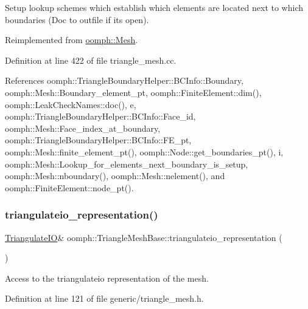 Setup lookup schemes which establish which elements are located next to which boundaries (Doc to outfile if it\textquotesingle{}s open). 

Reimplemented from \hyperlink{classoomph_1_1Mesh_a413cbcbea4fb1111703da9ee97429640}{oomph\+::\+Mesh}.



Definition at line 422 of file triangle\+\_\+mesh.\+cc.



References oomph\+::\+Triangle\+Boundary\+Helper\+::\+B\+C\+Info\+::\+Boundary, oomph\+::\+Mesh\+::\+Boundary\+\_\+element\+\_\+pt, oomph\+::\+Finite\+Element\+::dim(), oomph\+::\+Leak\+Check\+Names\+::doc(), e, oomph\+::\+Triangle\+Boundary\+Helper\+::\+B\+C\+Info\+::\+Face\+\_\+id, oomph\+::\+Mesh\+::\+Face\+\_\+index\+\_\+at\+\_\+boundary, oomph\+::\+Triangle\+Boundary\+Helper\+::\+B\+C\+Info\+::\+F\+E\+\_\+pt, oomph\+::\+Mesh\+::finite\+\_\+element\+\_\+pt(), oomph\+::\+Node\+::get\+\_\+boundaries\+\_\+pt(), i, oomph\+::\+Mesh\+::\+Lookup\+\_\+for\+\_\+elements\+\_\+next\+\_\+boundary\+\_\+is\+\_\+setup, oomph\+::\+Mesh\+::nboundary(), oomph\+::\+Mesh\+::nelement(), and oomph\+::\+Finite\+Element\+::node\+\_\+pt().

\mbox{\label{classoomph_1_1TriangleMeshBase_a1cd134700f02b81239a7de630a496dcf}} 
\subsubsection{\texorpdfstring{triangulateio\+\_\+representation()}{triangulateio\_representation()}}
{\footnotesize\ttfamily \hyperlink{structoomph_1_1TriangulateIO}{Triangulate\+IO}\& oomph\+::\+Triangle\+Mesh\+Base\+::triangulateio\+\_\+representation (\begin{DoxyParamCaption}{ }\end{DoxyParamCaption})\hspace{0.3cm}{\ttfamily [inline]}}



Access to the triangulateio representation of the mesh. 



Definition at line 121 of file generic/triangle\+\_\+mesh.\+h.



